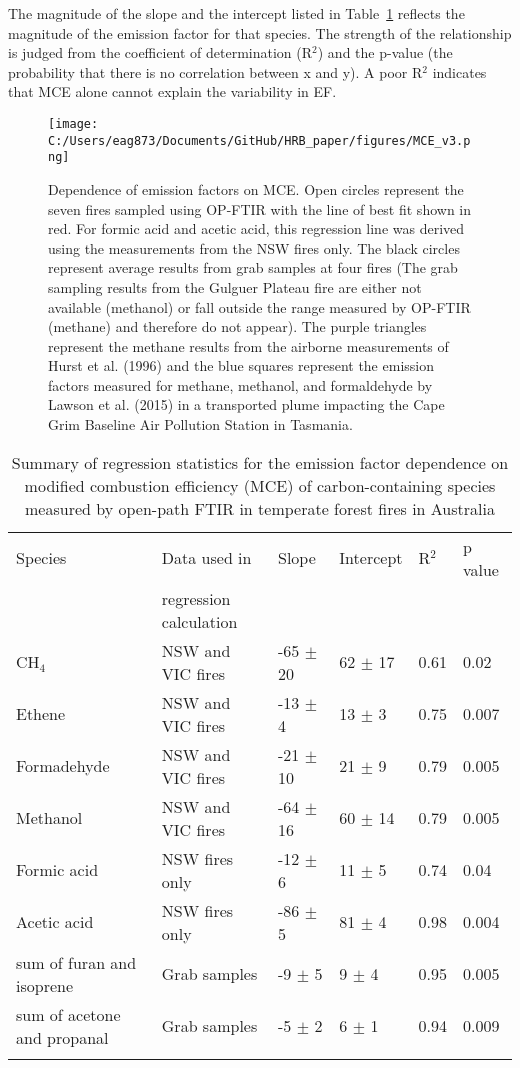 \documentclass[acp, manuscript]{copernicus}
\begin{document}
The magnitude of the slope and the intercept listed in Table~\ref{table:MCE_dep} reflects the magnitude of the emission factor for that species. The strength of the relationship is judged from the coefficient of determination (R$^2$) and the p-value (the probability that there is no correlation between x and y). A poor R$^2$ indicates that MCE alone cannot explain the variability in EF. 

\begin{figure}
  \texttt{[image: C:/Users/eag873/Documents/GitHub/HRB\_paper/figures/MCE\_v3.png]}
  \caption{Dependence of emission factors on MCE. Open circles represent the seven fires sampled using OP-FTIR with the line of best fit shown in red. For formic acid and acetic acid, this regression line was derived using the measurements from the NSW fires only. The black circles represent average results from grab samples at four fires (The grab sampling results from the Gulguer Plateau fire are either not available (methanol) or fall outside the range measured by OP-FTIR (methane) and therefore do not appear). The purple triangles represent the methane results from the airborne measurements of Hurst et al. (1996) and the blue squares represent the emission factors measured for methane, methanol, and formaldehyde by Lawson et al. (2015) in a transported plume impacting the Cape Grim Baseline Air Pollution Station in Tasmania.
  }
  \label{fig:MCE_dep}
\end{figure}

\begin{table}
    \caption{Summary of regression statistics for the emission factor dependence on modified combustion efficiency (MCE) of carbon-containing species measured by open-path FTIR in temperate forest fires in Australia}
  \begin{tabular}{l l l l l l } 
    \tophline
   Species & Data used in &  Slope & Intercept & R$^2$ & p value \\
   & regression calculation &&& &\\
   \hline
  CH$_4$& NSW and VIC fires & -65 $\pm$ 20 & 62 $\pm$ 17 & 0.61& 0.02 \\ 
  Ethene & NSW and VIC fires& -13 $\pm$ 4 & 13 $\pm$ 3 & 0.75 & 0.007 \\
  Formadehyde & NSW and VIC fires& -21 $\pm$ 10& 21 $\pm$ 9& 0.79 & 0.005\\
  Methanol  & NSW and VIC fires& -64 $\pm$ 16 & 60 $\pm$ 14 & 0.79 & 0.005\\
  Formic acid  & NSW fires only & -12 $\pm$ 6& 11 $\pm$ 5 & 0.74 & 0.04\\ 
  Acetic acid  & NSW fires only & -86 $\pm$ 5 & 81 $\pm$ 4 & 0.98 & 0.004 \\ 
  sum of furan and isoprene & Grab samples & -9 $\pm$ 5 & 9 $\pm$ 4 & 0.95 & 0.005 \\ 
  sum of acetone and propanal & Grab samples & -5 $\pm$ 2& 6 $\pm$ 1& 0.94 & 0.009 \\ 
    \bottomhline
  \end{tabular}
  \label{table:MCE_dep}
  \belowtable{} %
\end{table}
\end{document}

